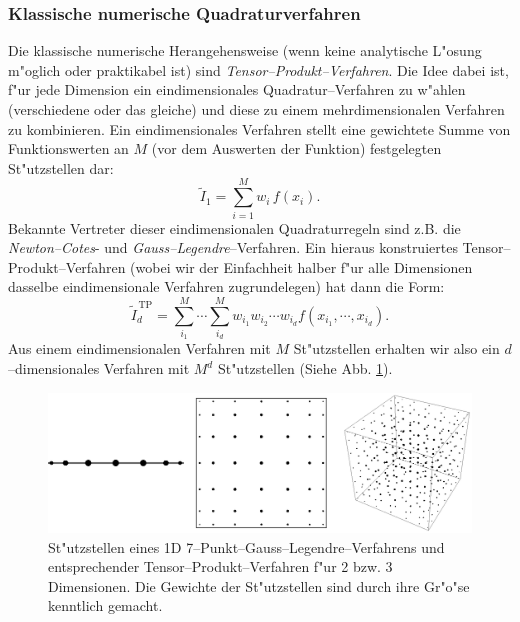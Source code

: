 	\subsubsection{Klassische numerische Quadraturverfahren}
	Die klassische numerische Herangehensweise (wenn keine analytische L"osung m"oglich oder praktikabel ist) sind {\em Tensor--Produkt--Verfahren}. Die Idee dabei ist, f"ur jede Dimension ein eindimensionales Quadratur--Verfahren zu w"ahlen (verschiedene oder das gleiche) und diese zu einem mehrdimensionalen Verfahren zu kombinieren. Ein eindimensionales Verfahren stellt eine gewichtete Summe von Funktionswerten an $M$ (vor dem Auswerten der Funktion) festgelegten St"utzstellen dar:
	$${\tilde I}_1=\sum_{i=1}^M w_i\,f(x_i).$$
	Bekannte Vertreter dieser eindimensionalen Quadraturregeln sind z.B. die {\em Newton--Cotes}- und {\em Gauss--Legendre}--Verfahren. Ein hieraus konstruiertes Tensor--Produkt--Verfahren (wobei wir der Einfachheit halber f"ur alle Dimensionen dasselbe eindimensionale Verfahren zugrundelegen) hat dann die Form:
	$${\tilde I}_d^{\,\text{TP}}=\sum_{i_1}^M\cdots\sum_{i_d}^M w_{i_1}w_{i_2}\cdots w_{i_d}f(x_{i_1},\cdots,x_{i_d}).$$
	Aus einem eindimensionalen Verfahren mit $M$ St"utzstellen erhalten wir also ein $d$--dimensionales Verfahren mit $M^d$ St"utzstellen (Siehe Abb. {\ref{fig:tensorproduct}}).
	\begin{figure}
		\centering
		\includegraphics[height=0.25\textheight]{tensorproduct_quadrature.eps}
		\caption{St"utzstellen eines 1D 7--Punkt--Gauss--Legendre--Verfahrens und entsprechender Tensor--Produkt--Verfahren f"ur 2 bzw. 3 Dimensionen. Die Gewichte der St"utzstellen sind durch ihre Gr"o"se kenntlich gemacht.}
		\label{fig:tensorproduct}
	\end{figure}
	
